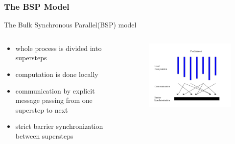 \documentclass[]{beamer}
\begin{document}
\begin{frame}
  \frametitle{The BSP Model}
  The Bulk Synchronous Parallel(BSP) model
  \begin{columns}
    \begin{column}{.5\textwidth}
      \begin{itemize}
        \item whole process is divided into \alert{superstep}s
        \item computation is done \alert{locally}
        \item communication by \alert{explicit message passing} from one superstep to next
        \item strict \alert{barrier synchronization} between supersteps
      \end{itemize}
    \end{column}
    \begin{column}{.5\textwidth}
      \begin{figure}
        \includegraphics[width=\textwidth]{figures/bsp-model}
      \end{figure}
    \end{column}
  \end{columns}
\end{frame}
\end{document}

